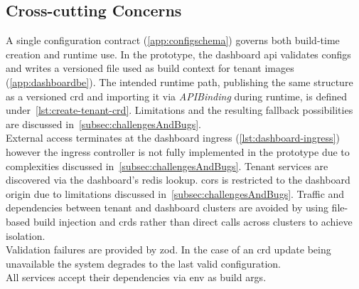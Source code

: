 \documentclass[11pt, a4paper, oneside, listof=totoc]{scrartcl}
\begin{document}
        \subsection{Cross-cutting Concerns}\label{subsec:crossCuttingConcerns}
            A single configuration contract (\autoref{app:configschema}) governs both build-time
            creation and runtime use.
            In the prototype, the dashboard \gls{api} validates configs and writes a versioned file
            used as build context for tenant images (\autoref{app:dashboardbe}).
            The intended runtime path, publishing the same structure as a versioned \gls{crd} and
            importing it via \emph{APIBinding} during runtime, is defined
            under~\autoref{lst:create-tenant-crd}.
            Limitations and the resulting fallback possibilities are discussed
            in~\autoref{subsec:challengesAndBugs}.\\
            External access terminates at the dashboard ingress (\autoref{lst:dashboard-ingress})
            however the ingress controller is not fully implemented in the prototype due to
            complexities discussed in~\autoref{subsec:challengesAndBugs}.
            Tenant services are discovered via the dashboard's redis lookup.
            \gls{cors} is restricted to the dashboard origin due to limitations discussed
            in~\autoref{subsec:challengesAndBugs}.
            Traffic and dependencies between tenant and dashboard clusters are avoided by using
            file-based build injection and \glspl{crd} rather than direct calls across clusters
            to achieve isolation.\\
            Validation failures are provided by zod.
            In the case of an \gls{crd} update being unavailable the system degrades to the last
            valid configuration.\\
            All services accept their dependencies via env as build args.
\end{document}
